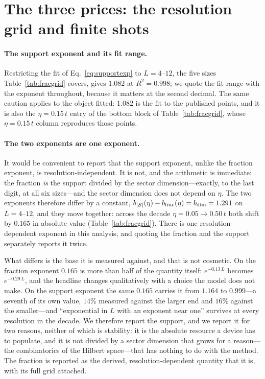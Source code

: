 \section{The three prices: the resolution grid and finite shots}
\label{sm:prices}

\paragraph{The support exponent and its fit range.} Restricting the fit of Eq.~\eqref{eq:supportexp} to
$L=4$--$12$, the five sizes Table~\ref{tab:fracgrid} covers, gives $1.082$ at $R^{2}=0.998$; we quote
the fit range with the exponent throughout, because it matters at the second decimal. The same caution
applies to the object fitted: $1.082$ is the fit to the published points, and it is also the
$\eta=0.15\,t$ entry of the bottom block of Table~\ref{tab:fracgrid}, whose $\eta=0.15\,t$ column
reproduces those points.

\paragraph{The two exponents are one exponent.} It would be convenient to report that the support
exponent, unlike the fraction exponent, is resolution-independent. It is not, and the arithmetic is
immediate: the fraction \emph{is} the support divided by the sector dimension---exactly, to the last
digit, at all six sizes---and the sector dimension does not depend on $\eta$. The two exponents
therefore differ by a constant,
$b_{|\mathcal S|}(\eta)-b_{\rm frac}(\eta)=b_{\dim}=1.291$ on $L=4$--$12$, and they move together:
across the decade $\eta=0.05\to0.50\,t$ both shift by $0.165$ in absolute value
(Table~\ref{tab:fracgrid}). There is one resolution-dependent exponent in this analysis, and quoting
the fraction and the support separately reports it twice.

What differs is the base it is measured against, and that is not cosmetic. On the fraction exponent
$0.165$ is more than half of the quantity itself: $e^{-0.13\,L}$ becomes $e^{-0.29\,L}$, and the
headline changes qualitatively with a choice the model does not make. On the support exponent the same
$0.165$ carries it from $1.164$ to $0.999$---a seventh of its own value, $14\%$ measured against the
larger end and $16\%$ against the smaller---and ``exponential in $L$ with an exponent near one''
survives at every resolution in the decade. We therefore report the support, and we report it for two reasons, neither of which is
stability: it is the absolute resource a device has to populate, and it is not divided by a sector
dimension that grows for a reason---the combinatorics of the Hilbert space---that has nothing to do
with the method. The fraction is reported as the derived, resolution-dependent quantity that it is,
with its full grid attached.

